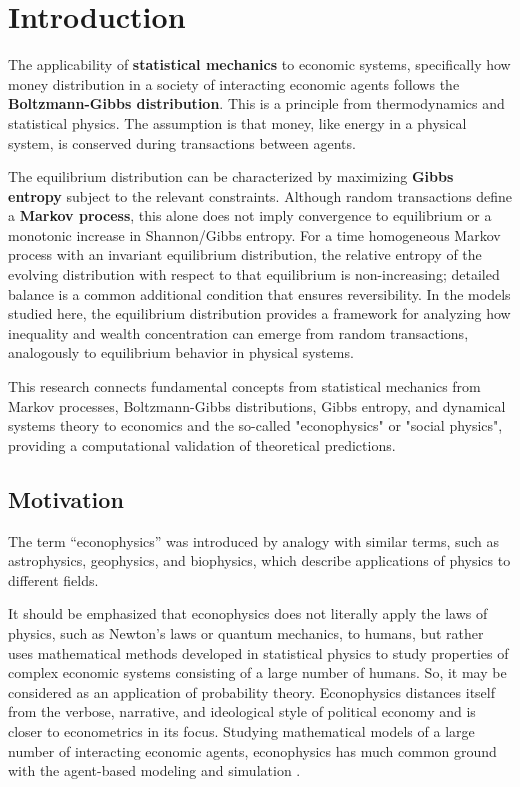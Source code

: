 
\section{Introduction}
The applicability of \textbf{statistical mechanics} to economic systems, specifically how money distribution in a society of interacting economic agents follows the \textbf{Boltzmann-Gibbs distribution}. \cite{ChakrabortiStatmech2000, dragulescu2000statistical}
This is a principle from thermodynamics and statistical physics. 
The assumption is that money, like energy in a physical system, is conserved during transactions between agents.

The equilibrium distribution can be characterized by maximizing \textbf{Gibbs entropy} subject to the relevant constraints. 
Although random transactions define a \textbf{Markov process}, this alone does not imply convergence to equilibrium or a monotonic increase in Shannon/Gibbs entropy. 
For a time homogeneous Markov process with an invariant equilibrium distribution, the relative entropy of the evolving distribution with respect to that equilibrium is non-increasing; 
detailed balance is a common additional condition that ensures reversibility. 
In the models studied here, the equilibrium distribution provides a framework for analyzing how inequality and wealth concentration can emerge from random transactions, analogously to equilibrium behavior in physical systems.

This research connects fundamental concepts from statistical mechanics from Markov processes, Boltzmann-Gibbs distributions, Gibbs entropy, and dynamical systems theory
to economics and the so-called "econophysics" or "social physics", providing a computational validation of theoretical predictions.

\vspace{1em}


\subsection{Motivation}
The term “econophysics” was introduced by analogy
with similar terms, such as astrophysics, geophysics, and
biophysics, which describe applications of physics to different fields.

It should be emphasized that
econophysics does not literally apply the laws of physics,
such as Newton's laws or quantum mechanics, to humans,
but rather uses mathematical methods developed in statistical
physics to study properties of complex
economic systems consisting of a large number of humans. 
So, it may be considered as an application
of probability theory.
Econophysics distances itself from the verbose, narrative, and ideological style of
political economy and is closer to econometrics in its
focus. Studying mathematical models of a large number
of interacting economic agents, econophysics has much
common ground with the agent-based modeling and
simulation \cite{Yakovenko2009}. 


